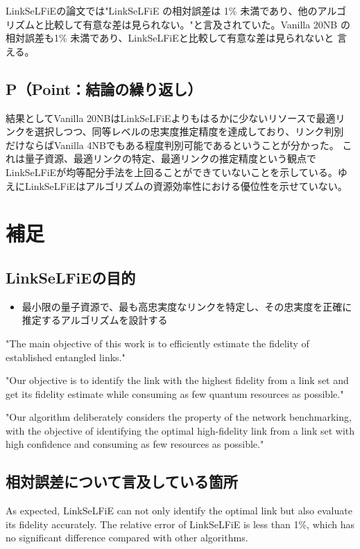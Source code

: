 \documentclass[technicalreport,dvipdfmx]{ieicej}
\begin{document}
LinkSeLFiEの論文では"LinkSeLFiE の相対誤差は 1\% 未満であり、他のアルゴ
リズムと比較して有意な差は見られない。"と言及されていた。Vanilla 20NB
の相対誤差も1\% 未満であり、LinkSeLFiEと比較して有意な差は見られないと
言える。




\subsection{P（Point：結論の繰り返し）}
\label{sec:org355c392}
結果としてVanilla 20NBはLinkSeLFiEよりもはるかに少ないリソースで最適リ
ンクを選択しつつ、同等レベルの忠実度推定精度を達成しており、リンク判別
だけならばVanilla 4NBでもある程度判別可能であるということが分かった。
これは量子資源、最適リンクの特定、最適リンクの推定精度という観点で
LinkSeLFiEが均等配分手法を上回ることができていないことを示している。ゆ
えにLinkSeLFiEはアルゴリズムの資源効率性における優位性を示せていない。


\section{補足}
\label{sec:org6cbcc1d}
\subsection{LinkSeLFiEの目的}
\label{sec:orgac240c6}
\begin{itemize}
\item 最小限の量子資源で、最も高忠実度なリンクを特定し、その忠実度を正確に推定するアルゴリズムを設計する
\end{itemize}

"The main objective of this work is to efficiently estimate the fidelity of established entangled links."

"Our objective is to identify the link with the highest fidelity from a
link set and get its fidelity estimate while consuming as few quantum
resources as possible."

"Our algorithm deliberately considers the property of the network
benchmarking, with the objective of identifying the optimal
high-fidelity link from a link set with high confidence and consuming
as few resources as possible."

\subsection{相対誤差について言及している箇所}
\label{sec:orgfa77427}
As expected, LinkSeLFiE can not only identify the optimal link but
also evaluate its fidelity accurately. The relative error of
LinkSeLFiE is less than 1\%, which has no significant difference
compared with other algorithms.
\end{document}
